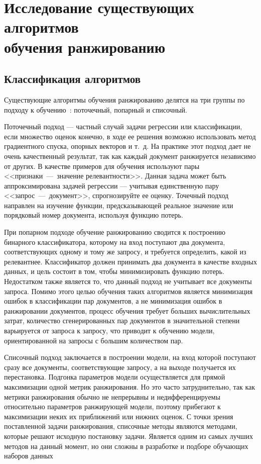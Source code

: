 \chapter{Исследование существующих алгоритмов \\обучения ранжированию}

\section{Классификация алгоритмов}

Существующие алгоритмы обучения ранжированию делятся на три группы по подходу к обучению~\cite{ML_for_SE}: поточечный, попарный и списочный.

Поточечный подход --- частный случай задачи регрессии или классификации, если множество оценок конечно, в ходе ее решения возможно использовать метод градиентного спуска, опорных векторов и т.~д. На практике этот подход дает не очень качественный результат, так как каждый документ ранжируется независимо от других. В качестве примеров для обучения используют пары <<признаки~---~значение релевантности>>. Данная задача может быть аппроксимирована задачей регрессии --- учитывая единственную пару <<запрос~---~документ>>, спрогнозируйте ее оценку. Точечный подход направлен на изучение функции, предсказывающей реальное значение или порядковый номер документа, используя функцию потерь.

При попарном подходе обучение ранжированию сводится к построению бинарного классификатора, которому на вход поступают два документа, соответствующих одному и тому же запросу, и требуется определить, какой из релевантнее. Классификатор должен принимать два документа в качестве входных данных, и цель состоит в том, чтобы минимизировать функцию потерь. Недостатком также является то, что данный подход не учитывает все документы запроса. Помимо этого целью обучения таких алгоритмов является минимизация ошибок в классификации пар документов, а не минимизация ошибок в ранжировании документов, процесс обучения требует больших вычислительных затрат, количество сгенерированных пар документов в значительной степени варьируется от запроса к запросу, что приводит к обучению модели, ориентированной на запросы с большим количеством пар.

Списочный подход заключается в построении модели, на вход которой поступают сразу все документы, соответствующие запросу, а на выходе получается их перестановка. Подгонка параметров модели осуществляется для прямой максимизации одной метрик ранжирования. Но это часто затруднительно, так как метрики ранжирования обычно не непрерывны и недифференцируемы относительно параметров ранжирующей модели, поэтому прибегают к максимизации неких их приближений или нижних оценок. С точки зрения поставленной задачи ранжирования, списочные методы являются методами, которые решают исходную постановку задачи. Является одним из самых лучших методов на данный момент, но они сложны в разработке и подборе обучающих наборов данных




